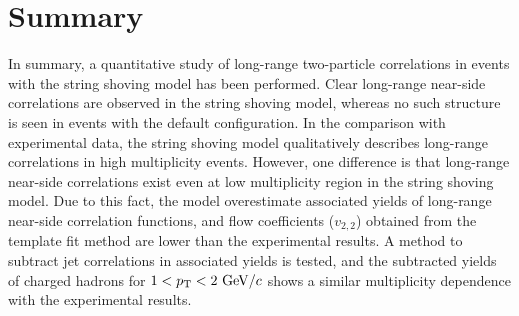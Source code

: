 \section{Summary}
\label{sec:summary}

In summary, a quantitative study of long-range two-particle correlations in \pythia events with the string shoving model has been performed.
Clear long-range near-side correlations are observed in the string shoving model, whereas no such structure is seen in \pythia events with the default configuration.
In the comparison with experimental data, the string shoving model qualitatively describes long-range correlations in high multiplicity events.
However, one difference is that long-range near-side correlations exist even at low multiplicity region in the string shoving model.
Due to this fact, the model overestimate associated yields of long-range near-side correlation functions, and flow coefficients ($v_{2,2}$) obtained from the template fit method are lower than
the experimental results.
A method to subtract jet correlations in associated yields is tested, and the subtracted yields of charged hadrons for $1<\mbox{$p_{\mathrm{T}}$}<2~\mathrm{GeV}/c$ shows a similar multiplicity dependence with the experimental results.